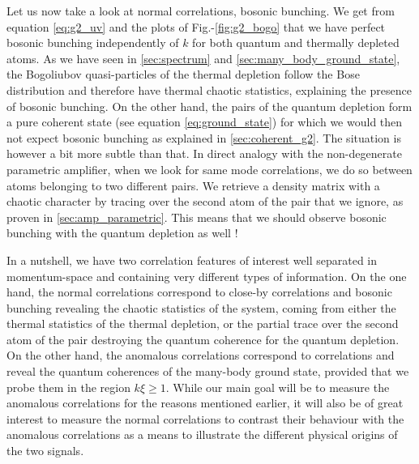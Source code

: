 Let us now take a look at normal correlations, \ie bosonic bunching. We get from equation \ref{eq:g2_uv} and the plots of Fig.-\ref{fig:g2_bogo} that we have perfect bosonic bunching independently of $k$ for both quantum and thermally depleted atoms. As we have seen in \ref{sec:spectrum} and \ref{sec:many_body_ground_state}, the Bogoliubov quasi-particles of the thermal depletion follow the Bose distribution and therefore have thermal chaotic statistics, explaining the presence of bosonic bunching. On the other hand, the \kmk pairs of the quantum depletion form a pure coherent state (see equation \ref{eq:ground_state}) for which we would then not expect bosonic bunching as explained in \ref{sec:coherent_g2}. The situation is however a bit more subtle than that. In direct analogy with the non-degenerate parametric amplifier, when we look for same mode \kk correlations, we do so between atoms belonging to two different pairs. We retrieve a density matrix with a chaotic character \cite{yurke1987} by tracing over the second atom of the pair that we ignore, as proven in \ref{sec:amp_parametric}. This means that we should observe bosonic bunching with the quantum depletion as well \cite{butera2020}!


In a nutshell, we have two correlation features of interest well separated in momentum-space and containing very different types of information. On the one hand, the normal correlations correspond to close-by correlations and bosonic bunching revealing the chaotic statistics of the system, coming from either the thermal statistics of the thermal depletion, or the partial trace over the second atom of the pair destroying the quantum coherence for the quantum depletion. On the other hand, the anomalous correlations correspond to \kmk correlations and reveal the quantum coherences of the many-body ground state, provided that we probe them in the region $k \xi \geq 1$. While our main goal will be to measure the anomalous \kmk correlations for the reasons mentioned earlier, it will also be of great interest to measure the normal correlations to contrast their behaviour with the anomalous correlations as a means to illustrate the different physical origins of the two signals. 


